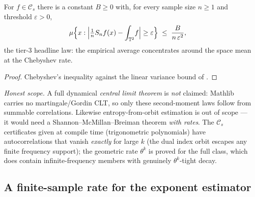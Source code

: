 \begin{theorem}\label{catConcentration_fourierDecay}
  \leanok
  For \(f\in\mathcal C_s\) there is a constant \(B\ge 0\) with, for every sample size \(n\ge 1\) and
  threshold \(\varepsilon > 0\),
  \[
    \mu\Bigl\{x : \Bigl\lvert \tfrac1n S_n f(x) - \int_{\mathbb{T}^2}\! f \Bigr\rvert \ge \varepsilon\Bigr\}
      \;\le\; \frac{B}{n\,\varepsilon^2},
  \]
  the tier-3 headline law: the empirical average concentrates around the space mean at the Chebyshev
  rate.
\end{theorem}
\begin{proof}\leanok
  Chebyshev's inequality against the linear variance bound of .
\end{proof}

\emph{Honest scope.} A full dynamical \emph{central limit theorem} is \emph{not} claimed: Mathlib
carries no martingale/Gordin CLT, so only these second-moment laws follow from summable correlations.
Likewise entropy-from-orbit estimation is out of scope --- it would need a Shannon--McMillan--Breiman
theorem \emph{with rates}. The \(\mathcal C_s\) certificates given at compile time (trigonometric
polynomials) have autocorrelations that vanish \emph{exactly} for large \(k\) (the dual index orbit
escapes any finite frequency support); the geometric rate \(\theta^{k}\) is proved for the full class,
which does contain infinite-frequency members with genuinely \(\theta^{k}\)-tight decay.

\subsection{A finite-sample rate for the exponent estimator}

